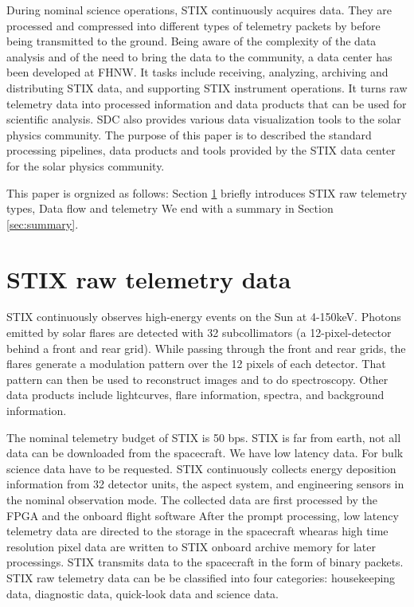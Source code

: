 \documentclass{aa}
\begin{document}
During nominal science operations, STIX continuously acquires data. They are processed and compressed into different types of telemetry packets by
before being transmitted to the ground.
Being aware of the complexity of the data analysis and of
the need to bring the data to the community, a data center has been
developed at FHNW.
It tasks include receiving, analyzing, archiving and distributing STIX data, and supporting STIX instrument operations.
It turns raw telemetry data into processed information and data products that can be used for scientific analysis.
SDC also provides various data visualization tools to the solar physics community.
The purpose of this paper is to described the standard processing pipelines, data products and tools provided by the STIX data center for the solar physics community.

This paper is orgnized as follows: Section \ref{sec:raw-data} briefly introduces STIX raw telemetry types, Data flow and telemetry
We end with a summary in Section \ref{sec:summary}.
\section{STIX raw telemetry data}
\label{sec:raw-data}

STIX continuously observes high-energy events on the Sun at 4-150keV. Photons emitted by solar flares are detected with 32 subcollimators (a 12-pixel-detector behind a front and rear grid). While passing through the front and rear grids, the flares generate a modulation pattern over the 12 pixels of each detector. That pattern can then be used to reconstruct images and to do spectroscopy. Other data products include lightcurves, flare information, spectra, and background information.

The nominal telemetry budget of STIX is 50 bps.
STIX is far from earth, not all data can be downloaded from the spacecraft. We have low latency data.
For bulk science data have to be requested.
STIX continuously collects energy deposition information from 32 detector units, the aspect system,
and engineering sensors in the nominal observation mode.
The collected data are first processed by the FPGA and the onboard flight software
After the prompt processing, low latency telemetry data are directed to the
storage in the spacecraft whearas high time resolution pixel data are written to STIX onboard archive memory for
later processings.
STIX transmits data to the spacecraft in the form of binary packets.
STIX raw telemetry data can be be classified into four
categories: housekeeping data, diagnostic data, quick-look data and science data.
\end{document}

